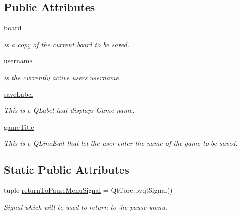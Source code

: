 \subsection*{Public Attributes}
\begin{DoxyCompactItemize}
\item 
\hyperlink{classsrc_1_1save__menu_1_1_save_menu_a5d5d8515ced22884dcd1a7f5d1943566}{board}
\begin{DoxyCompactList}\small\item\em is a copy of the current board to be saved. \end{DoxyCompactList}\item 
\hyperlink{classsrc_1_1save__menu_1_1_save_menu_afa694276e009bcb004df7c7a1a5da217}{username}
\begin{DoxyCompactList}\small\item\em is the currently active user\textquotesingle{}s username. \end{DoxyCompactList}\item 
\hyperlink{classsrc_1_1save__menu_1_1_save_menu_aed6ba9a74fc14066593c5ce7b2ae4691}{save\+Label}
\begin{DoxyCompactList}\small\item\em This is a Q\+Label that displays \textquotesingle{}Game name\textquotesingle{}. \end{DoxyCompactList}\item 
\hyperlink{classsrc_1_1save__menu_1_1_save_menu_a0673d06683a2c9f326d36958fe339a2a}{game\+Title}
\begin{DoxyCompactList}\small\item\em This is a Q\+Line\+Edit that let the user enter the name of the game to be saved. \end{DoxyCompactList}\end{DoxyCompactItemize}
\subsection*{Static Public Attributes}
\begin{DoxyCompactItemize}
\item 
tuple \hyperlink{classsrc_1_1save__menu_1_1_save_menu_a91e3384b3ca4264682fd7cc2fce47b0f}{return\+To\+Pause\+Menu\+Signal} = Qt\+Core.\+pyqt\+Signal()
\begin{DoxyCompactList}\small\item\em Signal which will be used to return to the pause menu. \end{DoxyCompactList}\end{DoxyCompactItemize}


